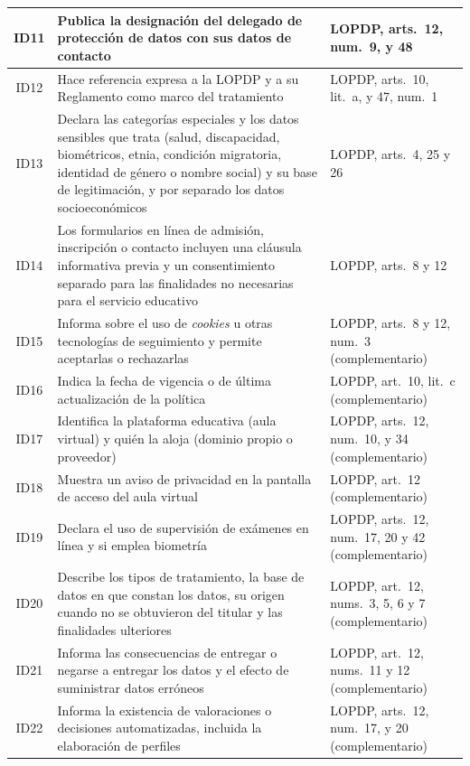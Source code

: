 \begin{table}[htbp]
\begin{tabularx}{\textwidth}{|c|L|>{\raggedright\arraybackslash}p{3.6cm}|}
    \hline
    ID11 & Publica la designación del delegado de protección de datos con sus datos de contacto & LOPDP, arts.~12, num.~9, y 48 \\
    \hline
    ID12 & Hace referencia expresa a la LOPDP y a su Reglamento como marco del tratamiento & LOPDP, arts.~10, lit.~a, y 47, num.~1 \\
    \hline
    ID13 & Declara las categorías especiales y los datos sensibles que trata (salud, discapacidad, biométricos, etnia, condición migratoria, identidad de género o nombre social) y su base de legitimación, y por separado los datos socioeconómicos & LOPDP, arts.~4, 25 y 26 \\
    \hline
    ID14 & Los formularios en línea de admisión, inscripción o contacto incluyen una cláusula informativa previa y un consentimiento separado para las finalidades no necesarias para el servicio educativo & LOPDP, arts.~8 y 12 \\
    \hline
    ID15 & Informa sobre el uso de \textit{cookies} u otras tecnologías de seguimiento y permite aceptarlas o rechazarlas & LOPDP, arts.~8 y 12, num.~3 (complementario) \\
    \hline
    ID16 & Indica la fecha de vigencia o de última actualización de la política & LOPDP, art.~10, lit.~c (complementario) \\
    \hline
    ID17 & Identifica la plataforma educativa (aula virtual) y quién la aloja (dominio propio o proveedor) & LOPDP, arts.~12, num.~10, y 34 (complementario) \\
    \hline
    ID18 & Muestra un aviso de privacidad en la pantalla de acceso del aula virtual & LOPDP, art.~12 (complementario) \\
    \hline
    ID19 & Declara el uso de supervisión de exámenes en línea y si emplea biometría & LOPDP, arts.~12, num.~17, 20 y 42 (complementario) \\
    \hline
    ID20 & Describe los tipos de tratamiento, la base de datos en que constan los datos, su origen cuando no se obtuvieron del titular y las finalidades ulteriores & LOPDP, art.~12, nums.~3, 5, 6 y 7 (complementario) \\
    \hline
    ID21 & Informa las consecuencias de entregar o negarse a entregar los datos y el efecto de suministrar datos erróneos & LOPDP, art.~12, nums.~11 y 12 (complementario) \\
    \hline
    ID22 & Informa la existencia de valoraciones o decisiones automatizadas, incluida la elaboración de perfiles & LOPDP, arts.~12, num.~17, y 20 (complementario) \\
    \hline
  \end{tabularx}
  \raggedright
\end{table}


